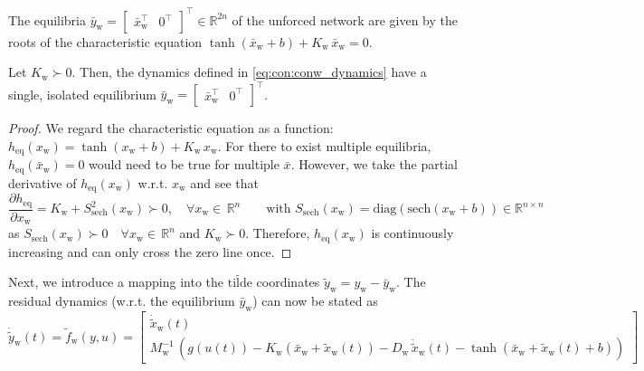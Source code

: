 The equilibria $\bar{y}_\mathrm{w} = \begin{bmatrix}
    \bar{x}_\mathrm{w}^\top & 0^\top
\end{bmatrix}^\top \in \mathbb{R}^{2n}$ of the unforced network are given by the roots of the characteristic equation $\tanh(\bar{x}_\mathrm{w} + b) + K_\mathrm{w} \, \bar{x}_\mathrm{w} = 0$.%
\begin{lemma}\label{lemma:con:conw_single_equilbrium}
    Let $K_\mathrm{w} \succ 0$. Then, the dynamics defined in \eqref{eq:con:conw_dynamics} have a single, isolated equilibrium $\bar{y}_\mathrm{w} = \begin{bmatrix}
        \bar{x}_\mathrm{w}^\top & 0^\top
    \end{bmatrix}^\top$.
\end{lemma}
\begin{proof}
    We regard the characteristic equation as a function: $h_\mathrm{eq}(x_\mathrm{w}) = \tanh(x_\mathrm{w} + b) + K_\mathrm{w} \, x_\mathrm{w}$. For there to exist multiple equilibria, $h_\mathrm{eq}(\bar{x}_\mathrm{w}) = 0$ would need to be true for multiple $\bar{x}$. However, we take the partial derivative of $h_\mathrm{eq}(x_\mathrm{w})$ w.r.t. $x_\mathrm{w}$ and see that
    \begin{equation}\label{eq:con:lemma_conw_single_equilbrium}
        \frac{\partial h_\mathrm{eq}}{\partial x_\mathrm{w}} =  K_\mathrm{w} + S_\mathrm{sech}^2(x_\mathrm{w}) \succ 0, \quad \forall x_\mathrm{w} \in \, \mathbb{R}^n
        \qquad \text{with }
        S_\mathrm{sech}(x_\mathrm{w}) = \mathrm{diag}(\mathrm{sech}(x_\mathrm{w} + b)) \in \mathbb{R}^{n \times n}
    \end{equation}
    as $S_\mathrm{sech}(x_\mathrm{w}) \succ 0 \quad \forall x_\mathrm{w} \in \, \mathbb{R}^n$ and $K_\mathrm{w} \succ 0$. Therefore, $h_\mathrm{eq}(x_\mathrm{w})$ is continuously increasing and can only cross the zero line once.
\end{proof}
Next, we introduce a mapping into the $\tilde{\text{tilde}}$ coordinates $\tilde{y}_\mathrm{w} = y_\mathrm{w} - \bar{y}_\mathrm{w}$. The residual dynamics (w.r.t. the equilibrium $\bar{y}_\mathrm{w}$) can now be stated as
\begin{equation}\label{eq:con:conw_residual_dynamics}
    \dot{\tilde{y}}_\mathrm{w}(t) = \tilde{f}_\mathrm{w}(y, u) = \begin{bmatrix}
        \dot{\tilde{x}}_\mathrm{w}(t)\\
        M_\mathrm{w}^{-1} \, \left (g(u(t)) -K_\mathrm{w} \left (\bar{x}_\mathrm{w} + \tilde{x}_\mathrm{w}(t) \right ) - D_\mathrm{w} \, \dot{\tilde{x}}_\mathrm{w}(t) - \tanh(\bar{x}_\mathrm{w} + \tilde{x}_\mathrm{w}(t) + b) \right )
    \end{bmatrix}
\end{equation}

